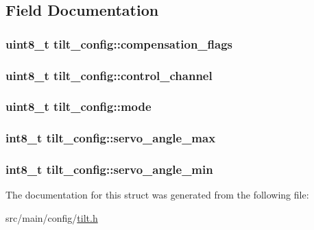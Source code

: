 \subsection{Field Documentation}
\hypertarget{structtilt__config_afef2faa3e927f727730fb334c41422fe}{
\subsubsection[{compensation\+\_\+flags}]{\setlength{\rightskip}{0pt plus 5cm}uint8\+\_\+t tilt\+\_\+config\+::compensation\+\_\+flags}}\label{structtilt__config_afef2faa3e927f727730fb334c41422fe}
\hypertarget{structtilt__config_a994829e6ff8a985dff7855560cc5c8ba}{
\subsubsection[{control\+\_\+channel}]{\setlength{\rightskip}{0pt plus 5cm}uint8\+\_\+t tilt\+\_\+config\+::control\+\_\+channel}}\label{structtilt__config_a994829e6ff8a985dff7855560cc5c8ba}
\hypertarget{structtilt__config_a47e92f99902b94f3866b7d601308a3a8}{
\subsubsection[{mode}]{\setlength{\rightskip}{0pt plus 5cm}uint8\+\_\+t tilt\+\_\+config\+::mode}}\label{structtilt__config_a47e92f99902b94f3866b7d601308a3a8}
\hypertarget{structtilt__config_a49ff48fa32c93f577d7142242e301201}{
\subsubsection[{servo\+\_\+angle\+\_\+max}]{\setlength{\rightskip}{0pt plus 5cm}int8\+\_\+t tilt\+\_\+config\+::servo\+\_\+angle\+\_\+max}}\label{structtilt__config_a49ff48fa32c93f577d7142242e301201}
\hypertarget{structtilt__config_a84f6ef24e9a3dc89d00e4cfd97f343a9}{
\subsubsection[{servo\+\_\+angle\+\_\+min}]{\setlength{\rightskip}{0pt plus 5cm}int8\+\_\+t tilt\+\_\+config\+::servo\+\_\+angle\+\_\+min}}\label{structtilt__config_a84f6ef24e9a3dc89d00e4cfd97f343a9}


The documentation for this struct was generated from the following file\+:\begin{DoxyCompactItemize}
\item 
src/main/config/\hyperlink{config_2tilt_8h}{tilt.\+h}\end{DoxyCompactItemize}
